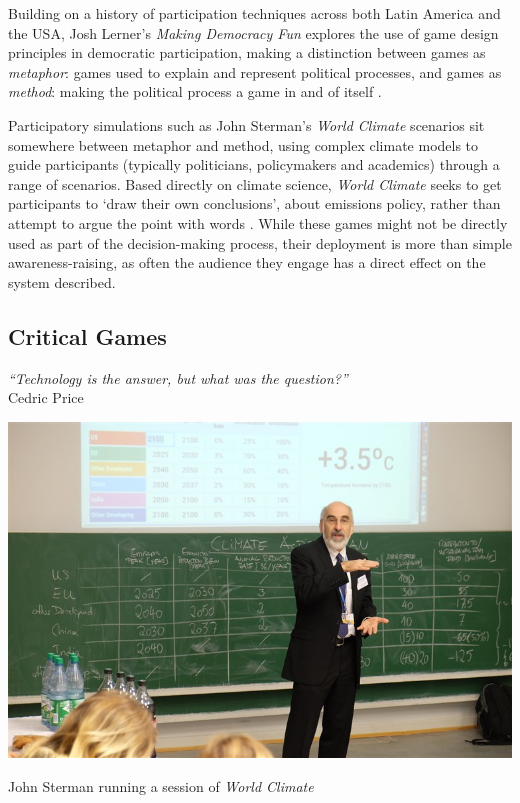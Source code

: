 \documentclass[nofonts,nols,justified,nobib]{tufte-book}
\begin{document}
Building on a history of participation techniques across both Latin America and the USA, Josh Lerner's \emph{Making Democracy Fun} explores the use of game design principles in democratic participation, making a distinction between games as \emph{metaphor}: games used to explain and represent political processes, and games as \emph{method}: making the political process a game in and of itself \cite{lerner_making_2014}. %

Participatory simulations such as John Sterman's \emph{World Climate} scenarios sit somewhere between metaphor and method, using complex climate models to guide participants (typically politicians, policymakers and academics) through a range of scenarios. Based directly on climate science, \emph{World Climate} seeks to get participants to `draw their own conclusions', about emissions policy, rather than attempt to argue the point with words \cite{sterman_john_2013}. While these games might not be directly used as part of the decision-making process, their deployment is more than simple awareness-raising, as often the audience they engage has a direct effect on the system described.

\subsection*{Critical Games}

\begin{flushright}
\emph{``Technology is the answer, but what was the question?''} \cite{price_technology_1979}\\
Cedric Price
\end{flushright}

\begin{marginfigure}
\includegraphics[width=\textwidth]{img/1/sterman-climate.jpg}
\caption{John Sterman running a session of \emph{World Climate} \cite{sterman_john_2013}}
\end{marginfigure}
\end{document}
